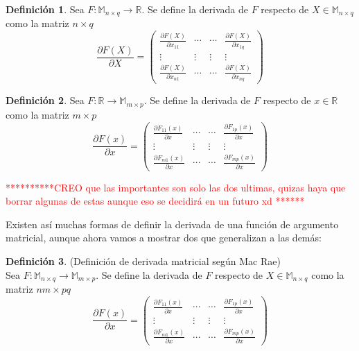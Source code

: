 \documentclass{article}
\theoremstyle{theorem-style}  %
\theoremstyle{definition}
\newtheorem{definition}{Definición}[section]
\theoremstyle{example-style}
\begin{document}
\begin{definition}
	Sea $F:\mathbb{M}_{n\times q}\rightarrow \mathbb{R}$. Se define la derivada de $F$ respecto de $X\in \mathbb{M}_{n\times q}$ como la matriz $n\times q$
	$$ \frac{\partial F(X)}{\partial X} = \left( \begin{array}{cccc}
			\frac{\partial F(X)}{\partial x_{11}} & \cdots & \cdots & \frac{\partial F(X)}{\partial x_{1q}}\\
			\vdots & \vdots & \vdots & \vdots \\
			\frac{\partial F(X)}{\partial x_{n1}} & \cdots & \cdots & \frac{\partial F(X)}{\partial x_{nq}}
	\end{array}\right)$$
\end{definition}

\begin{definition}
	Sea $F:\mathbb{R}\rightarrow \mathbb{M}_{m\times p}$. Se define la derivada de $F$ respecto de $x\in \mathbb{R}$ como la matriz $m\times p$
	$$ \frac{\partial F(x)}{\partial x} = \left( \begin{array}{cccc}
			\frac{\partial F_{11}(x)}{\partial x} & \cdots & \cdots & \frac{\partial F_{1p}(x)}{\partial x}\\
			\vdots & \vdots & \vdots & \vdots \\
			\frac{\partial F_{m1}(x)}{\partial x} & \cdots & \cdots & \frac{\partial F_{mp}(x)}{\partial x}
	\end{array}\right)$$	
\end{definition}

\textcolor{red}{**********CREO que las importantes son solo las dos ultimas, quizas haya que borrar algunas de estas aunque eso se decidirá en un futuro xd ******}

Existen así muchas formas de definir la derivada de una función de argumento matricial, aunque ahora vamos a mostrar dos que generalizan a las demás:

\begin{definition}
	(Definición de derivada matricial según Mac Rae)\\
	Sea $F:\mathbb{M}_{n\times q}\rightarrow \mathbb{M}_{m\times p}$. Se define la derivada de $F$ respecto de $X\in \mathbb{M}_{n\times q}$ como la matriz $nm\times pq$
	$$ \frac{\partial F(x)}{\partial x} = \left( \begin{array}{cccc}
	\frac{\partial F_{11}(x)}{\partial x} & \cdots & \cdots & \frac{\partial F_{1p}(x)}{\partial x}\\
	\vdots & \vdots & \vdots & \vdots \\
	\frac{\partial F_{m1}(x)}{\partial x} & \cdots & \cdots & \frac{\partial F_{mp}(x)}{\partial x}
	\end{array}\right)$$	
\end{definition}
\end{document}
